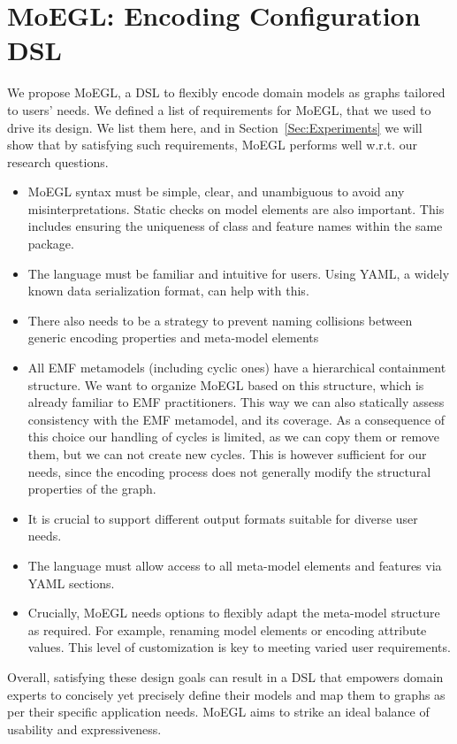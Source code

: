 \documentclass[journal,article,submit,moreauthors,technologies]{Definitions/mdpi}
\begin{document}
\section{MoEGL: Encoding Configuration DSL} \label{Sec:encodingconfigurationDSL}
We propose MoEGL, a DSL to flexibly encode domain models as graphs tailored to users' needs. We defined a list of requirements for MoEGL, that we used to drive its design. We list them here, and in Section~\ref{Sec:Experiments} we will show that by satisfying such requirements, MoEGL performs well w.r.t. our research questions.

\begin{itemize}
    \item MoEGL syntax must be simple, clear, and unambiguous to avoid any misinterpretations. Static checks on model elements are also important. This includes ensuring the uniqueness of class and feature names within the same package.
    \item The language must be familiar and intuitive for users. Using YAML, a widely known data serialization format, can help with this.
    \item There also needs to be a strategy to prevent naming collisions between generic encoding properties and meta-model elements
    \item All EMF metamodels (including cyclic ones) have a hierarchical containment structure. We want to organize MoEGL based on this structure, which is already familiar to EMF practitioners. This way we can also statically assess consistency with the EMF metamodel, and its coverage. As a consequence of this choice our handling of cycles is limited, as we can copy them or remove them, but we can not create new cycles. This is however sufficient for our needs, since the encoding process does not generally modify the structural properties of the graph.
    \item It is crucial to support different output formats suitable for diverse user needs.
    \item The language must allow access to all meta-model elements and features via YAML sections.
    \item Crucially, MoEGL needs options to flexibly adapt the meta-model structure as required. For example, renaming model elements or encoding attribute values. This level of customization is key to meeting varied user requirements.
\end{itemize}
Overall, satisfying these design goals can result in a DSL that empowers domain experts to concisely yet precisely define their models and map them to graphs as per their specific application needs. MoEGL aims to strike an ideal balance of usability and expressiveness.
\end{document}
